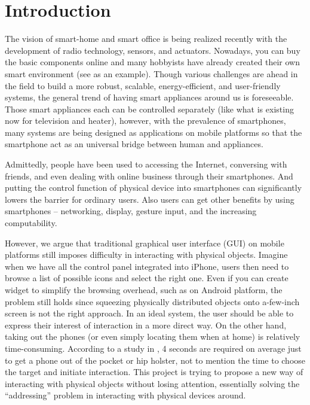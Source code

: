\section{Introduction}
\label{sec:introduction}

The vision of smart-home and smart office is being realized recently with the development of radio technology, sensors, and actuators. Nowadays, you can buy the basic components online \cite{SmartHome, NinjaBlocks} and many hobbyists have already created their own smart environment (see \cite{BRAD} as an example). Though various challenges are ahead in the field to build a more robust, scalable, energy-efficient, and user-friendly systems, the general trend of having smart appliances around us is foreseeable. Those smart appliances each can be controlled separately (like what is existing now for television and heater), however, with the prevalence of smartphones, many systems \cite{SmartThings, Lockitron} are being designed as applications on mobile platforms so that the smartphone act as an universal bridge between human and appliances.

Admittedly, people have been used to accessing the Internet, conversing with friends, and even dealing with online business through their smartphones. And putting the control function of physical device into smartphones can significantly lowers the barrier for ordinary users. Also users can get other benefits by using smartphones -- networking,  display, gesture input, and the increasing computability. 

However, we argue that traditional graphical user interface (GUI) on mobile platforms still imposes difficulty in interacting with physical objects. Imagine when we have all the control panel integrated into iPhone, users then need to browse a list of possible icons and select the right one. Even if you can create widget to simplify the browsing overhead, such as on Android platform, the problem still holds since squeezing physically distributed objects onto a-few-inch screen is not the right approach. In an ideal system, the user should be able to express their interest of interaction in a more direct way. On the other hand, taking out the phones (or even simply locating them when at home) is relatively time-consuming. According to a study in \cite{Ashbrook:2008:QIM:1357054.1357092}, 4 seconds are required on average just to get a phone out of the pocket or hip holster, not to mention the time to choose the target and initiate interaction. This project is trying to propose a new way of interacting with physical objects without losing attention, essentially solving the ``addressing'' problem in interacting with physical devices around.

